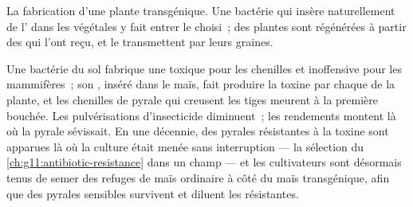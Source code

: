 \begin{omfigure}

{\small La fabrication d'une plante transgénique. Une bactérie qui
insère naturellement de l' dans les  végétales y fait
entrer le  choisi~; des plantes sont régénérées à partir des
 qui l'ont reçu, et le transmettent par leurs graines.}
\end{omfigure}

\begin{example}\label{ex:g12:domesticated-plants:bt}
Une bactérie du sol fabrique une  toxique pour les chenilles
et inoffensive pour les mammifères~; son , inséré dans le maïs,
fait produire la toxine par chaque  de la plante, et les
chenilles de pyrale qui creusent les tiges meurent à la première
bouchée. Les pulvérisations d'insecticide diminuent~; les rendements
montent là où la pyrale sévissait. En une décennie, des pyrales
résistantes à la toxine sont apparues là où la culture était menée
sans interruption --- la sélection du
\cref{ch:g11:antibiotic-resistance} dans un champ --- et les
cultivateurs sont désormais tenus de semer des refuges de maïs
ordinaire à côté du maïs transgénique, afin que des pyrales sensibles
survivent et diluent les résistantes.
\end{example}

